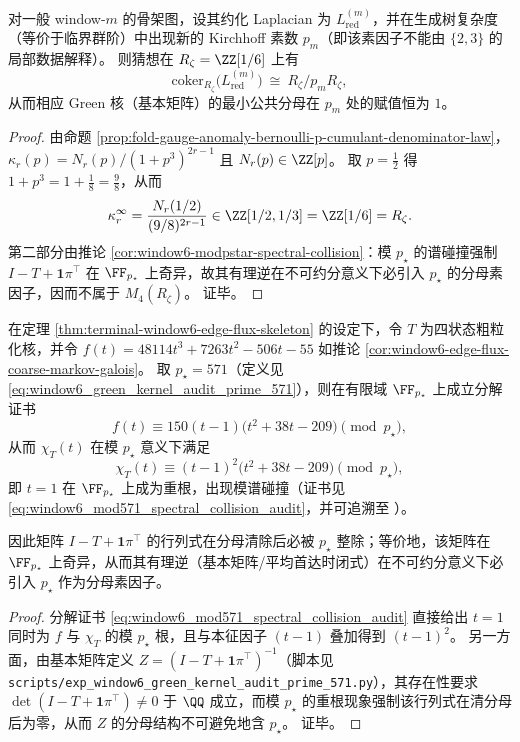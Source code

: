 \begin{conjecture}\label{conj:window-kirchhoff-prime-single-order-localization}
对一般 window-\(m\) 的骨架图，设其约化 Laplacian 为 \(L_{\mathrm{red}}^{(m)}\)，并在生成树复杂度（等价于临界群阶）中出现新的 Kirchhoff 素数 \(p_m\)（即该素因子不能由 \(\{2,3\}\) 的局部数据解释）。
则猜想在 \(R_\zeta=\ZZ[1/6]\) 上有
\[
\mathrm{coker}_{R_\zeta}\!\bigl(L_{\mathrm{red}}^{(m)}\bigr)\ \cong\ R_\zeta/p_mR_\zeta,
\]
从而相应 Green 核（基本矩阵）的最小公共分母在 \(p_m\) 处的赋值恒为 \(1\)。
\end{conjecture}

\begin{proof}
由命题 \ref{prop:fold-gauge-anomaly-bernoulli-p-cumulant-denominator-law}，
\(
\kappa_r(p)=N_r(p)/(1+p^3)^{2r-1}
\)
且 \(N_r(p)\in\ZZ[p]\)。
取 \(p=\tfrac12\) 得 \(1+p^3=1+\tfrac18=\tfrac98\)，从而
\[
\kappa_r^\infty=\frac{N_r(1/2)}{(9/8)^{2r-1}}\in \ZZ[1/2,1/3]=\ZZ[1/6]=R_\zeta.
\]
第二部分由推论 \ref{cor:window6-modpstar-spectral-collision}：模 \(p_\star\) 的谱碰撞强制 \(I-T+\mathbf 1\pi^\top\) 在 \(\FF_{p_\star}\) 上奇异，故其有理逆在不可约分意义下必引入 \(p_\star\) 的分母素因子，因而不属于 \(M_4(R_\zeta)\)。
证毕。
\end{proof}

\begin{corollary}\label{cor:window6-modpstar-spectral-collision}
在定理 \ref{thm:terminal-window6-edge-flux-skeleton} 的设定下，令 \(T\) 为四状态粗粒化核，并令
\(
f(t)=48114t^3+7263t^2-506t-55
\)
如推论 \ref{cor:window6-edge-flux-coarse-markov-galois}。
取 \(p_\star=571\)（定义见 \eqref{eq:window6_green_kernel_audit_prime_571}），则在有限域 \(\FF_{p_\star}\) 上成立分解证书
\[
f(t)\equiv 150(t-1)\bigl(t^2+38t-209\bigr)\pmod{p_\star},
\]
从而 \(\chi_T(t)\) 在模 \(p_\star\) 意义下满足
\[
\chi_T(t)\equiv (t-1)^2\bigl(t^2+38t-209\bigr)\pmod{p_\star},
\]
即 \(t=1\) 在 \(\FF_{p_\star}\) 上成为重根，出现模谱碰撞（证书见 \eqref{eq:window6_mod571_spectral_collision_audit}，并可追溯至 \cite{Internal2026Window6Mod571SpectralCollisionAudit20260227}）。
\par
因此矩阵 \(I-T+\mathbf 1\pi^\top\) 的行列式在分母清除后必被 \(p_\star\) 整除；等价地，该矩阵在 \(\FF_{p_\star}\) 上奇异，从而其有理逆（基本矩阵/平均首达时闭式）在不可约分意义下必引入 \(p_\star\) 作为分母素因子。
\end{corollary}
\begin{proof}
分解证书 \eqref{eq:window6_mod571_spectral_collision_audit} 直接给出 \(t=1\) 同时为 \(f\) 与 \(\chi_T\) 的模 \(p_\star\) 根，且与本征因子 \((t-1)\) 叠加得到 \((t-1)^2\)。
另一方面，由基本矩阵定义 \(Z=(I-T+\mathbf 1\pi^\top)^{-1}\)（脚本见 \texttt{scripts/exp\_window6\_green\_kernel\_audit\_prime\_571.py}），其存在性要求 \(\det(I-T+\mathbf 1\pi^\top)\neq 0\) 于 \(\QQ\) 成立，而模 \(p_\star\) 的重根现象强制该行列式在清分母后为零，从而 \(Z\) 的分母结构不可避免地含 \(p_\star\)。
证毕。
\end{proof}


